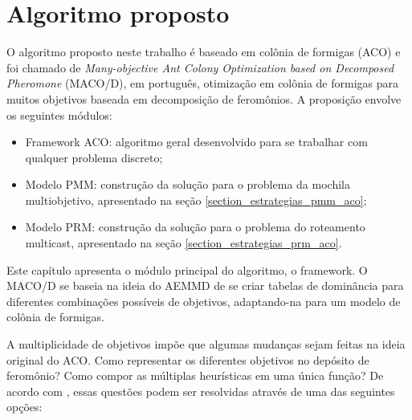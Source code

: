 \chapter[Algoritmo proposto]{Algoritmo proposto}
\label{chapter_macod}

O algoritmo proposto neste trabalho é baseado em colônia de formigas (ACO) e foi chamado de \textit{Many-objective Ant Colony Optimization based on Decomposed Pheromone} (MACO/D), em português, otimização em colônia de formigas para muitos objetivos baseada em decomposição de feromônios. A proposição envolve os seguintes módulos:

\begin{itemize}
	\item Framework ACO: algoritmo geral desenvolvido para se trabalhar com qualquer problema discreto;
	\item Modelo PMM: construção da solução para o problema da mochila multiobjetivo, apresentado na seção \ref{section_estrategias_pmm_aco};
	\item Modelo PRM: construção da solução para o problema do roteamento multicast, apresentado na seção \ref{section_estrategias_prm_aco}.
\end{itemize}

Este capítulo apresenta o módulo principal do algoritmo, o framework. O MACO/D se baseia na ideia do AEMMD de se criar tabelas de dominância para diferentes combinações possíveis de objetivos, adaptando-na para um modelo de colônia de formigas.

A multiplicidade de objetivos impõe que algumas mudanças sejam feitas na ideia original do ACO. Como representar os diferentes objetivos no depósito de feromônio? Como compor as múltiplas heurísticas em uma única função? De acordo com \cite{Alaya2007}, essas questões podem ser resolvidas através de uma das seguintes opções:

